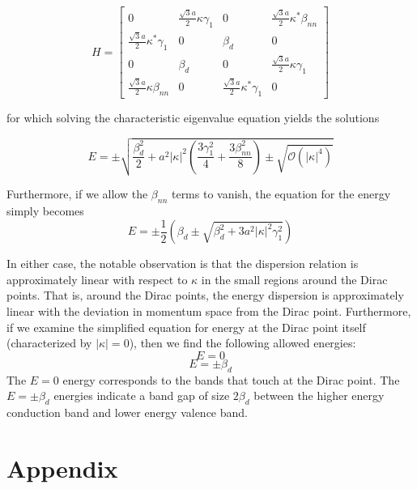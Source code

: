 \documentclass{article}
\begin{document}
\begin{equation}
H =
\begin{bmatrix}
0 & \frac{\sqrt{3}a}{2}\kappa\gamma_{1} & 0 & \frac{\sqrt{3}a}{2}\kappa^{*}\beta_{nn}\\
\frac{\sqrt{3}a}{2}\kappa^{*}\gamma_{1} & 0 & \beta_{d} & 0 \\
0 & \beta_{d} & 0  & \frac{\sqrt{3}a}{2}\kappa\gamma_{1} \\
\frac{\sqrt{3}a}{2}\kappa\beta_{nn} & 0 & \frac{\sqrt{3}a}{2}\kappa^{*}\gamma_{1}& 0
\end{bmatrix}
\end{equation}

for which solving the characteristic eigenvalue equation yields the solutions

\begin{equation}
E = \pm \sqrt{\frac{\beta_d^{2}}{2} + a^{2}|\kappa|^{2}\left (\frac{3\gamma_{1}^{2}}{4} + \frac{3\beta_{nn}^{2}}{8}\right ) \pm \sqrt{\mathcal{O}(|\kappa|^{4})}}
\end{equation}

Furthermore, if we allow the $\beta_{nn}$ terms to vanish, the equation for the energy simply becomes
\begin{equation}
E = \pm\frac{1}{2}\left ( \beta_{d} \pm \sqrt{\beta_{d}^{2} + 3a^{2}|\kappa|^{2}\gamma_{1}^{2}} \right)
\end{equation}

In either case, the notable observation is that the dispersion relation is approximately linear with respect to $\kappa$ in the small regions around the Dirac points. That is, around the Dirac
points, the energy dispersion is approximately linear with the deviation in momentum space from the Dirac point. Furthermore, if we examine the simplified equation for energy at the
Dirac point itself (characterized by $|\kappa| = 0$), then we find the following allowed energies:
$$
E = 0
$$
\begin{equation}
E = \pm \beta_{d}
\end{equation}
The $E = 0$ energy corresponds to the bands that touch at the Dirac point. The $E = \pm \beta_{d}$ energies indicate a band gap
of size $2\beta_{d}$ between the higher energy conduction band and lower energy valence band.

\section{Appendix}
\end{document}

